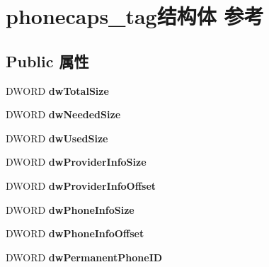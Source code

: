 \hypertarget{structphonecaps__tag}{}\section{phonecaps\+\_\+tag结构体 参考}
\label{structphonecaps__tag}
\subsection*{Public 属性}
\begin{DoxyCompactItemize}
\item 
\mbox{\label{structphonecaps__tag_ac7fa8522ae1fc89c3945f3e8c438348f}} 
D\+W\+O\+RD {\bfseries dw\+Total\+Size}
\item 
\mbox{\label{structphonecaps__tag_ac76ed511f3131e112c4b2d6dc538cea1}} 
D\+W\+O\+RD {\bfseries dw\+Needed\+Size}
\item 
\mbox{\label{structphonecaps__tag_acb733423deb719ccac529d62b39cd7fe}} 
D\+W\+O\+RD {\bfseries dw\+Used\+Size}
\item 
\mbox{\label{structphonecaps__tag_a8dba25b629fa88cfb38af808d2efd70f}} 
D\+W\+O\+RD {\bfseries dw\+Provider\+Info\+Size}
\item 
\mbox{\label{structphonecaps__tag_a126c7ea89b7dedcacb3e07dbb65a55da}} 
D\+W\+O\+RD {\bfseries dw\+Provider\+Info\+Offset}
\item 
\mbox{\label{structphonecaps__tag_ad22a9ec3cac62bbd6ddf7c8c39df5879}} 
D\+W\+O\+RD {\bfseries dw\+Phone\+Info\+Size}
\item 
\mbox{\label{structphonecaps__tag_a2a508a4fbec3c4011d05a6e5fb176c7f}} 
D\+W\+O\+RD {\bfseries dw\+Phone\+Info\+Offset}
\item 
\mbox{\label{structphonecaps__tag_a191ae1d848a94f2049ef37ad7501a1c0}} 
D\+W\+O\+RD {\bfseries dw\+Permanent\+Phone\+ID}
\item 
\mbox{\label{structphonecaps__tag_a3076ca9f5920ac20f27206928fc6d952}} 

\end{DoxyCompactItemize}
